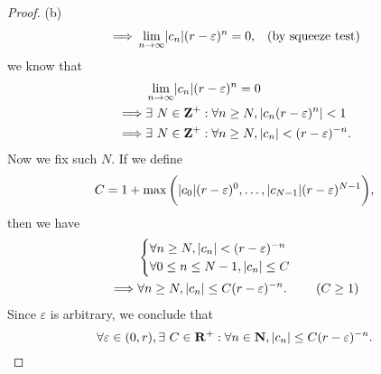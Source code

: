 \begin{proof}{(b)}
\begin{align*}
    \implies & \lim_{n \to \infty} \abs{c_n} (r - \varepsilon)^n = 0,                                  & \text{(by squeeze test)}
  \end{align*}
  we know that
  \begin{align*}
             & \lim_{n \to \infty} \abs{c_n} (r - \varepsilon)^n = 0                       \\
    \implies & \exists\ N \in \Z^+ : \forall n \geq N, \abs{c_n (r - \varepsilon)^n} < 1   \\
    \implies & \exists\ N \in \Z^+ : \forall n \geq N, \abs{c_n} < (r - \varepsilon)^{-n}.
  \end{align*}
  Now we fix such \(N\).
  If we define
  \[
    C = 1 + \max\bigg(\abs{c_0} (r - \varepsilon)^0, \dots, \abs{c_{N - 1}} (r - \varepsilon)^{N - 1}\bigg),
  \]
  then we have
  \begin{align*}
             & \begin{cases}
                 \forall n \geq N, \left\lvert c_n\right\rvert < (r - \varepsilon)^{-n} \\
                 \forall 0 \leq n \leq N - 1, \left\lvert c_n\right\rvert \leq C
               \end{cases}                    \\
    \implies & \forall n \geq N, \left\lvert c_n\right\rvert \leq C (r - \varepsilon)^{-n}. & (C \geq 1)
  \end{align*}
  Since \(\varepsilon\) is arbitrary, we conclude that
  \[
    \forall \varepsilon \in (0, r), \exists\ C \in \mathbf{R}^+ : \forall n \in \mathbf{N}, \left\lvert c_n\right\rvert \leq C (r - \varepsilon)^{-n}.
  \]
\end{proof}

